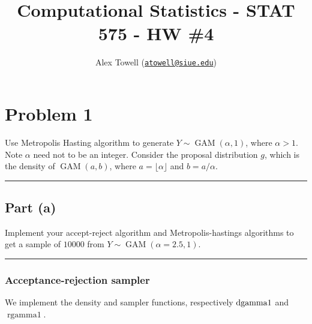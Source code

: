 \documentclass[
  11pt,
]{paper}
\title{Computational Statistics - STAT 575 - HW \#4}
\author{Alex Towell
(\href{mailto:atowell@siue.edu}{\nolinkurl{atowell@siue.edu}})}
\date{}
\begin{document}
\maketitle

\usepackage{amsmath}
\usepackage{mathtools}
\usepackage{amsthm}
\usepackage{bm}
\usepackage{xcolor}
\usepackage{fbox}
\usepackage{amsmath}

\newcommand{\var}{\operatorname{Var}}
\newcommand{\expect}{\operatorname{E}}
\newcommand{\cov}{\operatorname{Cov}}
\newcommand{\se}{\operatorname{SE}}
\newcommand{\mat}[1]{\mathbf{#1}}
\newcommand{\eval}[2]{\left. #1 \right\vert_{#2}}
\newcommand{\poi}{\operatorname{POI}}
\newcommand{\argmax}{\operatorname{arg\,max}}

\hypertarget{problem-1}{%
\section{Problem 1}\label{problem-1}}

Use Metropolis Hasting algorithm to generate
\(Y \sim \operatorname{GAM}(\alpha, 1)\), where \(\alpha > 1\). Note
\(\alpha\) need not to be an integer. Consider the proposal distribution
\(g\), which is the density of \(\operatorname{GAM}(a,b)\), where
\(a=\lfloor \alpha \rfloor\) and \(b = a/\alpha\).

\begin{center}\rule{0.5\linewidth}{0.5pt}\end{center}

\hypertarget{part-a}{%
\subsection{Part (a)}\label{part-a}}

Implement your accept-reject algorithm and Metropolis-hastings
algorithms to get a sample of \(10000\) from
\(Y \sim \operatorname{GAM}(\alpha=2.5,1)\).

\begin{center}\rule{0.5\linewidth}{0.5pt}\end{center}

\hypertarget{acceptance-rejection-sampler}{%
\subsubsection{Acceptance-rejection
sampler}\label{acceptance-rejection-sampler}}

We implement the density and sampler functions, respectively
\(\rm{dgamma1}\) and \(\operatorname{rgamma1}\).
\end{document}
